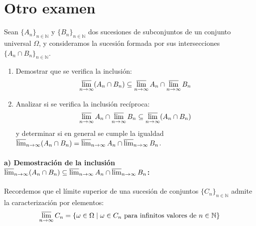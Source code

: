\section{Otro examen}
\setcounter{problemacontador}{0}
\begin{problema}
Sean $\{A_n\}_{n \in \mathbb{N}}$ y $\{B_n\}_{n \in \mathbb{N}}$ dos sucesiones de subconjuntos de un conjunto universal $\Omega$, y consideramos la sucesión formada por sus intersecciones $\{A_n \cap B_n\}_{n \in \mathbb{N}}$.
\begin{enumerate}[label=\alph*)]
    \item Demostrar que se verifica la inclusión:
    \[
        \varlimsup_{n \to \infty} (A_n \cap B_n) \subseteq \varlimsup_{n \to \infty} A_n \cap \varlimsup_{n \to \infty} B_n
    \]
    \item Analizar si se verifica la inclusión recíproca:
    \[
        \varlimsup_{n \to \infty} A_n \cap \varlimsup_{n \to \infty} B_n \subseteq \varlimsup_{n \to \infty} (A_n \cap B_n)
    \]
    y determinar si en general se cumple la igualdad $\varlimsup_{n \to \infty} (A_n \cap B_n) = \varlimsup_{n \to \infty} A_n \cap \varlimsup_{n \to \infty} B_n$.
\end{enumerate}

\tcblower

\paragraph{a) Demostración de la inclusión $\varlimsup_{n \to \infty} (A_n \cap B_n) \subseteq \varlimsup_{n \to \infty} A_n \cap \varlimsup_{n \to \infty} B_n$:}
Recordemos que el límite superior de una sucesión de conjuntos $\{C_n\}_{n \in \mathbb{N}}$ admite la caracterización por elementos:
\[
    \varlimsup_{n \to \infty} C_n = \{ \omega \in \Omega \mid \omega \in C_n \text{ para infinitos valores de } n \in \mathbb{N} \}
\]


\end{problema}
